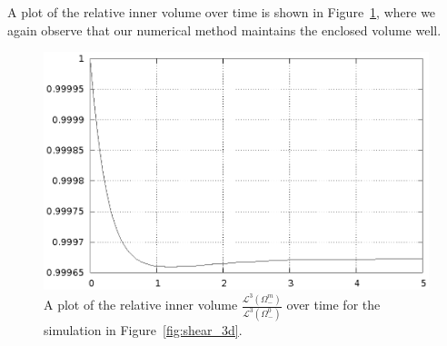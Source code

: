 A plot of the relative inner volume over time is shown in
Figure~\ref{fig:shear_3d_bulk_inner_volume}, where we again observe that our
numerical method maintains the enclosed volume well.
\begin{figure}[htbp]
\centering
\includegraphics[width=.45\textwidth]
{figures/stokes/3d_shear_bulk_inner_volume.ps}
\caption[Stokes 3d shear flow inner volume]
{A plot of the relative inner volume
$\frac{\mathcal{L}^3(\Omega^m_-)}{\mathcal{L}^3(\Omega^0_-)}$
over time for the simulation in Figure~\ref{fig:shear_3d}.}
\label{fig:shear_3d_bulk_inner_volume}
\end{figure}
